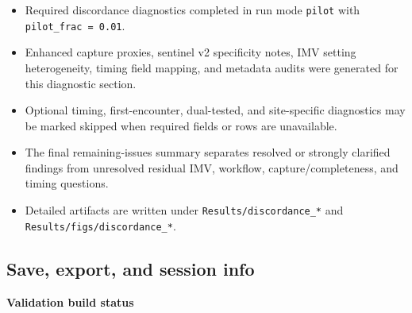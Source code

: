\documentclass[
  11pt,
  letterpaper,
  DIV=11,
  numbers=noendperiod]{scrartcl}
\providecommand{\tightlist}{%
  \setlength{\itemsep}{0pt}\setlength{\parskip}{0pt}}
\begin{document}
\begin{itemize}
\tightlist
\item
  Required discordance diagnostics completed in run mode \texttt{pilot}
  with \texttt{pilot\_frac\ =\ 0.01}.
\item
  Enhanced capture proxies, sentinel v2 specificity notes, IMV setting
  heterogeneity, timing field mapping, and metadata audits were
  generated for this diagnostic section.
\item
  Optional timing, first-encounter, dual-tested, and site-specific
  diagnostics may be marked skipped when required fields or rows are
  unavailable.
\item
  The final remaining-issues summary separates resolved or strongly
  clarified findings from unresolved residual IMV, workflow,
  capture/completeness, and timing questions.
\item
  Detailed artifacts are written under \texttt{Results/discordance\_*}
  and \texttt{Results/figs/discordance\_*}.
\end{itemize}

\subsection{Save, export, and session
info}\label{save-export-and-session-info}

\begin{center}\textbf{Validation build status}\end{center}
\end{document}
